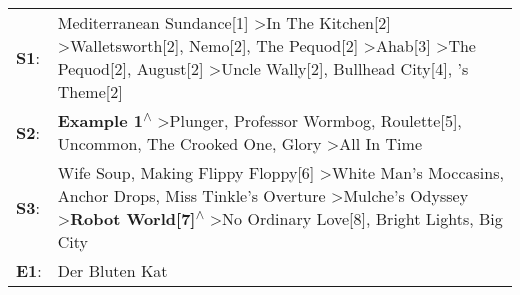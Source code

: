 \begin{supertabular}{p{0.03\textwidth}p{0.92\textwidth}}
 \textbf{S1}:  &  Mediterranean Sundance[1]\textsuperscript{} \textgreater \enspace In The Kitchen[2]\textsuperscript{} \textgreater \enspace Walletsworth[2]\textsuperscript{}, \enspace Nemo[2]\textsuperscript{}, \enspace The Pequod[2]\textsuperscript{} \textgreater \enspace Ahab[3]\textsuperscript{} \textgreater \enspace The Pequod[2]\textsuperscript{}, \enspace August[2]\textsuperscript{} \textgreater \enspace Uncle Wally[2]\textsuperscript{}, \enspace Bullhead City[4]\textsuperscript{}, 's Theme[2]\textsuperscript{}  \enspace  \\
 \textbf{S2}:  &                                                                                                                                                                              \textbf{Example 1\textsuperscript{$\wedge$}} \textgreater \enspace Plunger\textsuperscript{}, \enspace Professor Wormbog\textsuperscript{}, \enspace Roulette[5]\textsuperscript{}, \enspace Uncommon\textsuperscript{}, \enspace The Crooked One\textsuperscript{}, \enspace Glory\textsuperscript{} \textgreater \enspace All In Time\textsuperscript{}  \enspace  \\
 \textbf{S3}:  &                                             Wife Soup\textsuperscript{}, \enspace Making Flippy Floppy[6]\textsuperscript{} \textgreater \enspace White Man's Moccasins\textsuperscript{}, \enspace Anchor Drops\textsuperscript{}, \enspace Miss Tinkle's Overture\textsuperscript{} \textgreater \enspace Mulche's Odyssey\textsuperscript{} \textgreater \enspace \textbf{Robot World[7]\textsuperscript{$\wedge$}} \textgreater \enspace No Ordinary Love[8]\textsuperscript{}, \enspace Bright Lights, Big City\textsuperscript{}  \enspace  \\
 \textbf{E1}:  &                                                                                                                                                                                                                                                                                                                                                                                                                                                                                                       Der Bluten Kat\textsuperscript{}  \enspace  \\
\end{supertabular}
